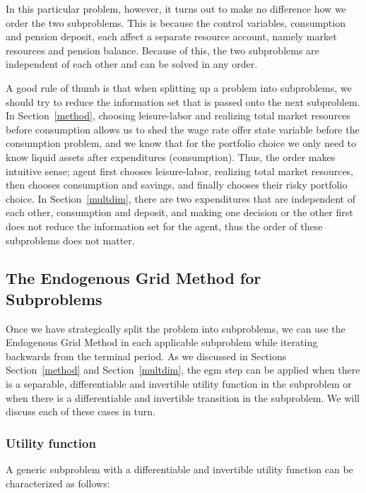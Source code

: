 \documentclass{article}
\begin{document}

In this particular problem, however, it turns out to make no difference how we order the two subproblems. This is because the control variables, consumption and pension deposit, each affect a separate resource account, namely market resources and pension balance. Because of this, the two subproblems are independent of each other and can be solved in any order.

A good rule of thumb is that when splitting up a problem into subproblems, we should try to reduce the information set that is passed onto the next subproblem. In Section~\ref{method}, choosing leisure-labor and realizing total market resources before consumption allows us to shed the wage rate offer state variable before the consumption problem, and we know that for the portfolio choice we only need to know liquid assets after expenditures (consumption). Thus, the order makes intuitive sense; agent first chooses leisure-labor, realizing total market resources, then chooses consumption and savings, and finally chooses their risky portfolio choice. In Section~\ref{multdim}, there are two expenditures that are independent of each other, consumption and deposit, and making one decision or the other first does not reduce the information set for the agent, thus the order of these subproblems does not matter.

\subsection{The Endogenous Grid Method for Subproblems}

Once we have strategically split the problem into subproblems, we can use the Endogenous Grid Method in each applicable subproblem while iterating backwards from the terminal period. As we discussed in Sections Section~\ref{method} and Section~\ref{multdim}, the \acrshort{egm} step can be applied when there is a separable, differentiable and invertible utility function in the subproblem or when there is a differentiable and invertible transition in the subproblem. We will discuss each of these cases in turn.

\subsubsection{Utility function}

A generic subproblem with a differentiable and invertible utility function can be characterized as follows:
\end{document}
